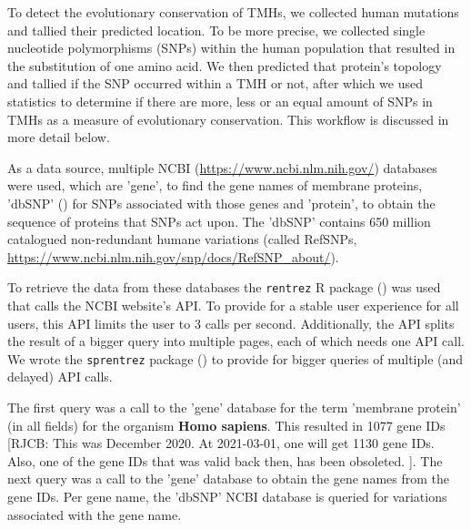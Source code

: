 
To detect the evolutionary conservation of TMHs, 
we collected human mutations and 
tallied their predicted location.
To be more precise, we collected single nucleotide
polymorphisms (SNPs) within the human population
that resulted in the substitution of one amino acid.
We then predicted that protein's topology and tallied if
the SNP occurred within a TMH or not, 
after which we used statistics to determine if there are
more, less or an equal amount of SNPs in TMHs
as a measure of evolutionary conservation.
This workflow is discussed in more detail below.


As a data source, multiple
NCBI (\url{https://www.ncbi.nlm.nih.gov/}) databases were used,
which are 'gene', to find the gene names of membrane proteins, 
'dbSNP' (\cite{sherry2001dbsnp}) for SNPs associated with those genes
and 'protein', to obtain the sequence of proteins that SNPs act upon.
The 'dbSNP' contains 650 million 
catalogued non-redundant humane variations (called RefSNPs,
\url{https://www.ncbi.nlm.nih.gov/snp/docs/RefSNP_about/}).


To retrieve the data from these databases the
\verb;rentrez; R package (\cite{rentrez}) was used
that calls the NCBI website's API. To provide for a 
stable user experience for all users, 
this API limits the user to 3 calls per second.
Additionally, the API splits the result of a bigger
query into multiple pages, each of which needs one API call.
We wrote the \verb;sprentrez; package (\cite{sprentrez}) to provide for 
bigger queries of multiple (and delayed) API calls.


The first query was a call to the 'gene' database for the 
term 'membrane protein' (in all fields) for the organism \textbf{Homo sapiens}.
This resulted in 1077 gene IDs
[RJCB:
  This was December 2020.
  At 2021-03-01, one will get 1130 gene IDs.
  Also, one of the gene IDs that was valid back then,
  has been obsoleted.
].
The next query was a call to the 'gene' database 
to obtain the gene names from the gene IDs.
Per gene name, the 'dbSNP' NCBI database is queried for 
variations associated with the gene name. 

